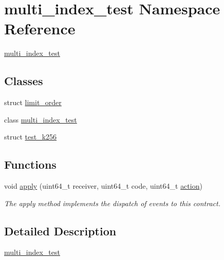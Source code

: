 \hypertarget{namespacemulti__index__test}{}\section{multi\+\_\+index\+\_\+test Namespace Reference}
\label{namespacemulti__index__test}


\mbox{\hyperlink{namespacemulti__index__test}{multi\+\_\+index\+\_\+test}}  


\subsection*{Classes}
\begin{DoxyCompactItemize}
\item 
struct \mbox{\hyperlink{structmulti__index__test_1_1limit__order}{limit\+\_\+order}}
\item 
class \mbox{\hyperlink{classmulti__index__test_1_1multi__index__test}{multi\+\_\+index\+\_\+test}}
\item 
struct \mbox{\hyperlink{structmulti__index__test_1_1test__k256}{test\+\_\+k256}}
\end{DoxyCompactItemize}
\subsection*{Functions}
\begin{DoxyCompactItemize}
\item 
\mbox{\label{namespacemulti__index__test_a8109a32ec4bbacf6f7d16183704e2559}} 
void \mbox{\hyperlink{namespacemulti__index__test_a8109a32ec4bbacf6f7d16183704e2559}{apply}} (uint64\+\_\+t receiver, uint64\+\_\+t code, uint64\+\_\+t \mbox{\hyperlink{structaacio_1_1action}{action}})
\begin{DoxyCompactList}\small\item\em The apply method implements the dispatch of events to this contract. \end{DoxyCompactList}\end{DoxyCompactItemize}


\subsection{Detailed Description}
\mbox{\hyperlink{namespacemulti__index__test}{multi\+\_\+index\+\_\+test}} 